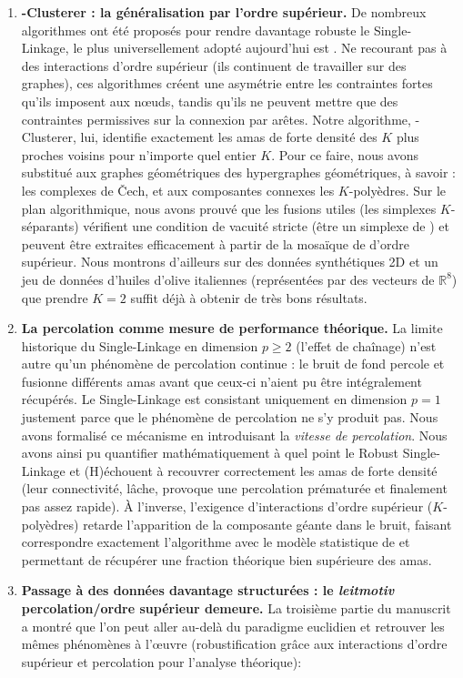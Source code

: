 \begin{enumerate}
    \item \textbf{\HGP-Clusterer : la généralisation par l'ordre supérieur.} De nombreux algorithmes ont été proposés pour rendre davantage robuste le Single-Linkage, le plus universellement adopté aujourd'hui est \HDBSCAN. Ne recourant pas à des interactions d'ordre supérieur (ils continuent de travailler sur des graphes), ces algorithmes créent une asymétrie entre les contraintes fortes qu'ils imposent aux nœuds, tandis qu'ils ne peuvent mettre que des contraintes permissives sur la connexion par arêtes.  Notre algorithme, \HGP-Clusterer, lui, identifie exactement les amas de forte densité des $K$ plus proches voisins pour n'importe quel entier $K$. Pour ce faire, nous avons substitué aux graphes géométriques des hypergraphes géométriques, à savoir : les complexes de \v Cech, et aux composantes connexes les $K$-polyèdres. Sur le plan algorithmique, nous avons prouvé que les fusions utiles (les simplexes $K$-séparants) vérifient une condition de vacuité stricte (être un simplexe de ) et peuvent être extraites efficacement à partir de la mosaïque de  d'ordre supérieur. Nous montrons d'ailleurs sur des données synthétiques 2D et un jeu de données d'huiles d'olive italiennes (représentées par des vecteurs de $\mathbb R^8$) que prendre $K=2$ suffit déjà à obtenir de très bons résultats.
    \item \textbf{La percolation comme mesure de performance théorique.} La limite historique du Single-Linkage en dimension $p \ge 2$ (l'effet de chaînage) n'est autre qu'un phénomène de percolation continue : le bruit de fond percole et fusionne différents amas avant que ceux-ci n'aient pu être intégralement récupérés. Le Single-Linkage est consistant uniquement en dimension $p=1$ justement parce que le phénomène de percolation ne s'y produit pas. Nous avons formalisé ce mécanisme en introduisant la \emph{vitesse de percolation}. Nous avons ainsi pu quantifier mathématiquement à quel point le Robust Single-Linkage et (H)\DBSCAN échouent à recouvrer correctement les amas de forte densité (leur connectivité, lâche, provoque une percolation prématurée et finalement pas assez rapide). À l'inverse, l'exigence d'interactions d'ordre supérieur ($K$-polyèdres) retarde l'apparition de la composante géante dans le bruit, faisant correspondre exactement l'algorithme avec le modèle statistique de  et permettant de récupérer une fraction théorique bien supérieure des amas.
    \item \textbf{Passage à des données davantage structurées : le \emph{leitmotiv} percolation/ordre supérieur demeure.} La troisième partie du manuscrit a montré que l'on peut aller au-delà du paradigme euclidien et retrouver les mêmes phénomènes à l'œuvre (robustification grâce aux interactions d'ordre supérieur et percolation pour l'analyse théorique):

\end{enumerate}
